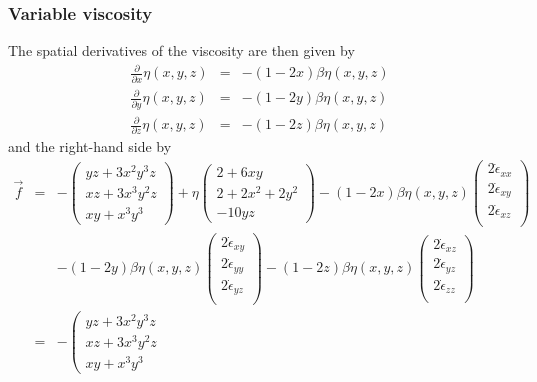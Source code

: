 \subsubsection*{Variable viscosity}
The spatial derivatives of the viscosity are then given by
\begin{eqnarray}
\frac{\partial }{\partial x} \eta(x,y,z) &=& -(1-2x)\beta \eta(x,y,z) \nonumber\\
\frac{\partial }{\partial y} \eta(x,y,z) &=& -(1-2y)\beta \eta(x,y,z) \nonumber\\
\frac{\partial }{\partial z} \eta(x,y,z) &=& -(1-2z)\beta \eta(x,y,z) \nonumber
\end{eqnarray}
and the right-hand side by
\begin{eqnarray}
\vec{f} 
&=& 
-
\left(
\begin{array}{c}
yz+3x^2y^3z\\
xz +3x^3y^2z \\
xy+x^3y^3
\end{array}
\right)
+\eta
\left(
\begin{array}{c}
2+6xy  \\
2 + 2x^2 +  2y^2 \\
-10yz 
\end{array}
\right) 
-(1-2x)\beta \eta (x,y,z)
\left(
\begin{array}{c}
2\dot{\epsilon}_{xx} \\
2\dot{\epsilon}_{xy} \\
2\dot{\epsilon}_{xz} \\
\end{array}
\right) \\
&&
-(1-2y)\beta \eta (x,y,z)
\left(
\begin{array}{c}
2\dot{\epsilon}_{xy} \\
2\dot{\epsilon}_{yy} \\
2\dot{\epsilon}_{yz} \\
\end{array}
\right)
-(1-2z)\beta \eta (x,y,z)
\left(
\begin{array}{c}
2\dot{\epsilon}_{xz} \\
2\dot{\epsilon}_{yz} \\
2\dot{\epsilon}_{zz} \\
\end{array}
\right) \nonumber\\
&=& 
-
\left(
\begin{array}{c}
yz+3x^2y^3z\\
xz +3x^3y^2z \\
xy+x^3y^3
\end{array}

\end{eqnarray}
